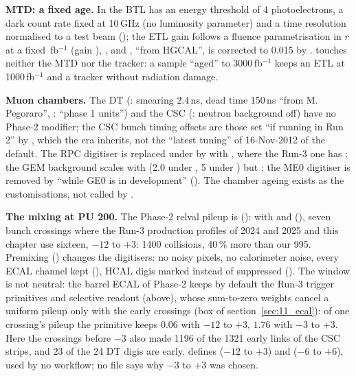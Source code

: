 \textbf{MTD: a fixed age.} In  the BTL has an energy
threshold of 4 photoelectrons, a dark count rate fixed at 10\,GHz (no luminosity parameter) and a time resolution
normalised to a test beam (); the ETL gain follows a fluence parametrisation in $r$ at
a fixed \,fb$^{-1}$ (gain ), ,
and , ``from HGCAL'', is corrected to 0.015 by .  touches
neither the MTD nor the tracker: a sample ``aged'' to 3000\,fb$^{-1}$ keeps an ETL at 1000\,fb$^{-1}$ and a tracker
without radiation damage.

\textbf{Muon chambers.} The DT (: smearing 2.4\,ns, dead time
150\,ns ``from M. Pegoraro'', : ``phase 1 units'') and the CSC
(: neutron background off) have no Phase-2 modifier; the CSC bunch
timing offsets are those set ``if running in Run 2'' by , which the era inherits, not the ``latest
tuning'' of 16-Nov-2012 of the default. The RPC digitiser is replaced under  by
 with , where the Run-3 one has ; the GEM background
scales with  (2.0 under , 5 under ) but ; the ME0 digitiser is removed by  ``while GE0 is in development''
(). The chamber ageing exists as the 
customisations, not called by .

\textbf{The mixing at PU 200.} The Phase-2 relval pileup is 
():  with 
and  (), seven bunch crossings where the Run-3
production profiles of 2024 and 2025 and this chapter use sixteen, $-12$ to $+3$: 1400 collisions, 40\,\% more than our
995. Premixing () changes the digitisers: no noisy pixels, no calorimeter noise, every ECAL channel kept (), HCAL digis
marked instead of suppressed (). The window is not neutral: the barrel ECAL of Phase-2 keeps by
default the Run-3 trigger primitives and selective readout (above), whose sum-to-zero weights cancel a uniform pileup
only with the early crossings (box of section~\ref{sec:11_ecal}): of one crossing's pileup the primitive keeps $0.06$
with $-12$ to $+3$, $1.76$ with $-3$ to $+3$. Here the crossings before $-3$ also made 1196 of the 1321 early links of
the CSC strips, and 23 of the 24 DT digis are early.  defines  ($-12$
to $+3$) and  ($-6$ to $+6$), used by no workflow; no file says why $-3$ to $+3$ was chosen.
